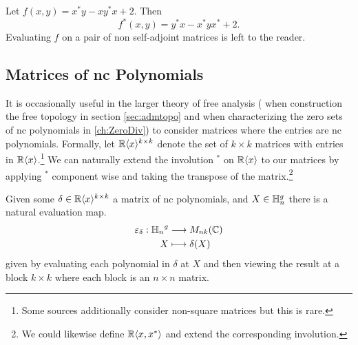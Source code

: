 \begin{example}
  Let \(f(x,y) = x^*y - x y^* x +2\). Then
  \[
    f^*(x,y) = y^*x - x^*yx^* + 2.
  \]
  Evaluating \(f\) on a pair of non self-adjoint matrices is left to the reader.
\end{example}

\subsection{Matrices of nc Polynomials}

It is occasionally useful in the larger theory of free analysis (\eg{} when
construction the free topology in section \ref{sec:admtopo} and when
characterizing the zero sets of nc polynomials in \cref{ch:ZeroDiv}) to consider
matrices where the entries are nc polynomials. Formally,
let \(\mathbb{R} \langle x \rangle ^{k\times k}\) denote the set of \(k \times k\) matrices
with entries in \(\mathbb{R} \langle x \rangle \).\footnote{Some sources additionally
  consider non-square matrices but this is rare.}
We can naturally extend the involution \(^*\) on \(\mathbb{R} \langle x \rangle \) to
our matrices by applying \(^*\) component wise and taking the transpose of the
matrix.\footnote{We could likewise define
  \(\mathbb{R} \langle x,x^* \rangle\) and extend the corresponding involution.}

Given some \(\delta \in \mathbb{R} \langle x \rangle ^{k \times k}\) a matrix of nc
polynomials, and \(X \in \mathbb{H}_n^g\) there is a natural evaluation map.
\begin{align*}
  \varepsilon_\delta: {\mathbb{H}_n}^g &\longrightarrow M_{nk}(\mathbb{C}) \\
             X &\longmapsto \delta(X)
\end{align*}
given by evaluating each polynomial in \(\delta\) at \(X\) and then viewing the
result at a block \(k \times k\) where each block is an \(n \times n\) matrix.


